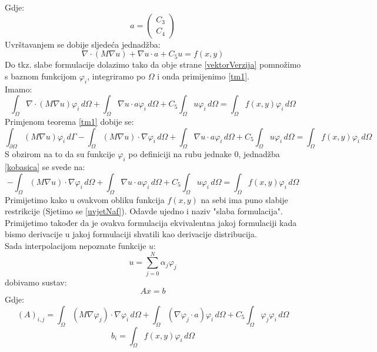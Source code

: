 \documentclass[zavrsnirad]{../fer}
\begin{document}
Gdje:
$$a = 
\begin{pmatrix}
  C_3\\ 
  C_4
\end{pmatrix}
$$
Uvrštavanjem se dobije sljedeća jednadžba:
\begin{equation}
  \label{vektorVerzija}
\nabla \cdot (M \nabla u)  + \nabla u \cdot a + C_5u = f(x,y)
\end{equation}
Do tkz. slabe formulacije dolazimo tako da obje strane \ref{vektorVerzija} 
pomnožimo
s baznom funkcijom $\varphi_i$, integriramo po $\Omega$
i onda primijenimo  \ref{tm1}.\\ 
Imamo:
\begin{equation}
  \int_{\Omega}\nabla \cdot (M \nabla u) \varphi_i \, d\Omega  + 
  \int_{\Omega} \nabla u \cdot a\varphi_i \, d\Omega  + C_5\int_{\Omega}u\varphi_i\,d\Omega  =
  \int_{\Omega}f(x,y)\varphi_i \, d\Omega 
\end{equation}
Primjenom teorema \ref{tm1} 
dobije se:
\begin{equation}
  \label{kobasica}
  \int_{\partial \Omega}(M \nabla u) \varphi_i \, d\Gamma  - 
  \int_{\Omega}(M \nabla u) \cdot \nabla \varphi_i \, d\Omega  + 
  \int_{\Omega} \nabla u \cdot a\varphi_i \, d\Omega  + C_5\int_{\Omega}u\varphi_i\,d\Omega  =
  \int_{\Omega}f(x,y)\varphi_i \, d\Omega 
\end{equation}
S obzirom na to da su funkcije $\varphi_i$ po definiciji
na rubu jednake $0$, jednadžba 
\ref{kobasica} se 
svede na:
\begin{equation}
  \label{slabaFor}
  -\int_{\Omega}(M \nabla u) \cdot \nabla \varphi_i \, d\Omega  + 
  \int_{\Omega} \nabla u \cdot a\varphi_i \, d\Omega  + C_5\int_{\Omega}u\varphi_i\,d\Omega  =
  \int_{\Omega}f(x,y)\varphi_i \, d\Omega 
\end{equation}
Primijetimo kako u ovakvom obliku funkcija $f(x,y)$ 
na sebi ima puno slabije restrikcije (Sjetimo se \ref{uvjetNaf}).
Odavde ujedno i naziv "slaba formulacija". Primijetimo također 
da je ovakva formulacija ekvivalentna jakoj formulaciji 
kada bismo derivacije u jakoj formulaciji shvatili kao 
derivacije distribucija.
\bigskip
\\
Sada interpolacijom nepoznate funkcije $u$:
$$u = \sum_{j=0}^N \alpha_j \varphi_j$$
dobivamo sustav:
\begin{equation}
\label{linSustav}
A x = b
\end{equation}
Gdje:
\begin{equation}
\label{elMat}
(A)_{i,j} = \int_{\Omega} (M\nabla \varphi_j) \cdot \nabla \varphi_i \, d\Omega + 
\int_{\Omega} (\nabla \varphi_j \cdot a) \varphi_i \, d\Omega +
C_5 \int_{\Omega} \varphi_j \varphi_i \, d\Omega
\end{equation}
$$b_i = \int_{\Omega} f(x,y) \varphi_i \, d \Omega$$
\end{document}
